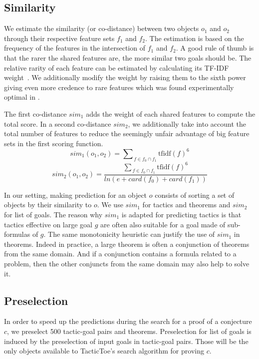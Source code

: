 \documentclass[runningheads,a4paper,draft]{svjour3}
\def\tactictoe{\textsf{TacticToe}\xspace}
\begin{document}
\subsection{Similarity}\label{sec:predictions}
We estimate the similarity (or co-distance) between two objects $o_1$ and $o_2$
through their respective feature sets $f_1$ and $f_2$.
The estimation is based on the frequency of the features in the intersection of
$f_1$ and $f_2$. A good rule of thumb is that the rarer the shared features
are, the more similar two goals should be. The relative rarity of each feature
can be estimated by calculating its TF-IDF weight~\cite{Jones72astatistical}.
We additionally modify the weight by raising them to the sixth power giving
even more credence
to rare features which was found experimentally optimal in \cite{}.

The first co-distance $sim_1$ adds the weight of each shared
features to compute the total score.
In a second co-distance $sim_2$, we additionally take into account
the total number of features to reduce the seemingly unfair advantage of big
feature sets in the first scoring function.
\[sim_1 (o_1, o_2) = {\sum\nolimits_{\,f \in f_0 \cap
f_1}{\text{tfidf}(f)^{6}}}\]
\[sim_2 (o_1, o_2) = \frac{{\sum\nolimits_{\,f \in f_0 \cap
f_1}{\text{tfidf}(f)^{6}}}}
{ln (e + card(f_0) + card(f_1))}\]

In our setting, making prediction for an object $o$ consists of sorting a set
of objects by their similarity to $o$. We use $sim_1$ for tactics and theorems
and $sim_2$ for list of goals. The reason why $sim_1$ is adapted for
predicting tactics is that tactics effective on large goal $g$ are often also
suitable for a goal made of sub-formulas of $g$. The same monotonicity
heuristic can justify the use of $sim_1$ in theorems. Indeed in practice, a
large theorem is often a conjunction of theorems from the same domain.
And if a conjunction contains a formula related to a problem, then the other
conjuncts from the same domain may also help to solve it.

\subsection{Preselection}\label{sec:dependencies}

In order to speed up the predictions during the search for a proof of a
conjecture $c$, we preselect 500 tactic-goal pairs and theorems.
Preselection for list of goals is induced by the preselection of input
goals in tactic-goal pairs. Those will be the only objects available to
\tactictoe's search algorithm for proving $c$.
\end{document}
